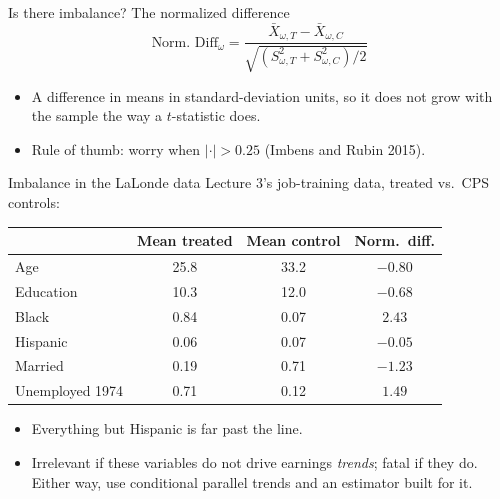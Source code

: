 \documentclass[
  11pt,
  ignorenonframetext,
  aspectratio=169,
]{beamer}
\providecommand{\tightlist}{%
  \setlength{\itemsep}{0pt}\setlength{\parskip}{0pt}}
\begin{document}
\begin{frame}{Is there imbalance? The normalized difference}
\protect{}\label{is-there-imbalance-the-normalized-difference}
\[
\text{Norm.\ Diff}_\omega = \frac{\bar X_{\omega,T} - \bar X_{\omega,C}}{\sqrt{(S^2_{\omega,T} + S^2_{\omega,C})/2}}
\]

\begin{itemize}
\tightlist
\item
  A difference in means in standard-deviation units, so it does not grow
  with the sample the way a \(t\)-statistic does.
\item
  Rule of thumb: worry when \(|{\cdot}| > 0.25\) (Imbens and Rubin
  2015).
\end{itemize}
\end{frame}

\begin{frame}{Imbalance in the LaLonde data}
\protect{}\label{imbalance-in-the-lalonde-data}
Lecture 3's job-training data, treated vs.~CPS controls:

\begin{center}\small
\begin{tabular}{lccc}
\toprule
 & Mean treated & Mean control & Norm.\ diff. \\
\midrule
Age & 25.8 & 33.2 & $-0.80$ \\
Education & 10.3 & 12.0 & $-0.68$ \\
Black & 0.84 & 0.07 & $2.43$ \\
Hispanic & 0.06 & 0.07 & $-0.05$ \\
Married & 0.19 & 0.71 & $-1.23$ \\
Unemployed 1974 & 0.71 & 0.12 & $1.49$ \\
\bottomrule
\end{tabular}
\end{center}

\begin{itemize}
\tightlist
\item
  Everything but Hispanic is far past the line.
\item
  Irrelevant if these variables do not drive earnings \emph{trends};
  fatal if they do. Either way, use conditional parallel trends and an
  estimator built for it.
\end{itemize}
\end{frame}
\end{document}
